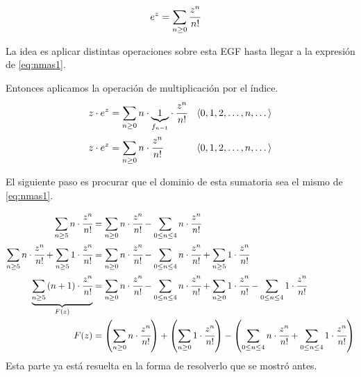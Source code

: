 \begin{align*}
e^z&=\sum_{n\geq0}{\cfrac{z^{n}}{n!}}
\end{align*}

La idea es aplicar distintas operaciones sobre esta EGF hasta llegar a la expresión de \eqref{eq:nmas1}.

Entonces aplicamos la operación de multiplicación por el índice.
\begin{align*}
z\cdot e^z&=\sum_{n\geq0}{n\cdot \underset{f_{n-1}}{\underbrace{1}}\cdot \cfrac{z^{n}}{n!}}&\langle0, 1, 2,\dots,n,\dots\rangle\\
z\cdot e^z&=\sum_{n\geq0}{n\cdot \cfrac{z^{n}}{n!}}&\langle0, 1, 2,\dots,n,\dots\rangle
\end{align*}

El siguiente paso es procurar que el dominio de esta sumatoria sea el mismo de \eqref{eq:nmas1}.

\begin{align*}
\sum_{n\geq5}{n\cdot \cfrac{z^{n}}{n!}}&=\sum_{n\geq0}{n\cdot\cfrac{z^{n}}{n!}}-\sum_{0\leq n\leq 4}{n\cdot \cfrac{z^{n}}{n!}}\\
\sum_{n\geq5}{n\cdot \cfrac{z^{n}}{n!}}+\sum_{n\geq5}{1\cdot \cfrac{z^{n}}{n!}}&=\sum_{n\geq0}{n\cdot\cfrac{z^{n}}{n!}}-\sum_{0\leq n\leq 4}{n\cdot \cfrac{z^{n}}{n!}}+\sum_{n\geq5}{1\cdot \cfrac{z^{n}}{n!}}\\
\underset{F(z)}{\underbrace{\sum_{n\geq5}{\left(n+1\right)\cdot \cfrac{z^{n}}{n!}}}}&=\sum_{n\geq0}{n\cdot\cfrac{z^{n}}{n!}}-\sum_{0\leq n\leq 4}{n\cdot \cfrac{z^{n}}{n!}}+\sum_{n\geq0}{1\cdot \cfrac{z^{n}}{n!}}-\sum_{0\leq n\leq 4}{1\cdot \cfrac{z^{n}}{n!}}\\
F(z)&=\left(\sum_{n\geq0}{n\cdot\cfrac{z^{n}}{n!}}\right)+\left(\sum_{n\geq0}{1\cdot\cfrac{z^{n}}{n!}}\right)-\left(\sum_{0\leq n\leq 4}{n\cdot \cfrac{z^{n}}{n!}}+\sum_{0\leq n\leq 4}{1\cdot \cfrac{z^{n}}{n!}}\right)
\end{align*}
Esta parte ya está resuelta en la forma de resolverlo que se mostró antes.